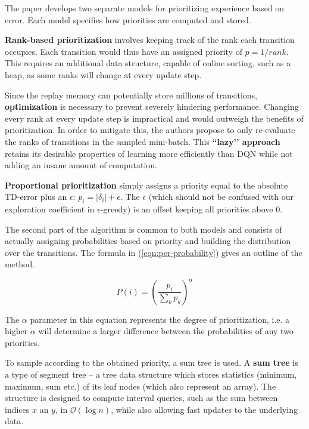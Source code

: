 The paper develops two separate models for prioritizing experience based on error.
Each model specifies how priorities are computed and stored.

\textbf{Rank-based prioritization} involves keeping track of the rank each transition occupies.
Each transition would thus have an assigned priority of $p = 1 / rank$.
This requires an additional data structure, capable of online sorting, such as a heap, as some ranks will change at every update step.

Since the replay memory can potentially store millions of transitions, \textbf{optimization} is necessary to prevent severely hindering performance.
Changing every rank at every update step is impractical and would outweigh the benefits of prioritization.
In order to mitigate this, the authors propose to only re-evaluate the ranks of transitions in the sampled mini-batch.
This \textbf{``lazy’’ approach} retains its desirable properties of learning more efficiently than DQN while not adding an insane amount of computation.

\textbf{Proportional prioritization} simply assigns a priority equal to the absolute TD-error plus an $\epsilon$: $p_{i} = |\delta_{i}| + \epsilon$.
The $\epsilon$ (which should not be confused with our exploration coefficient in $\epsilon$-greedy) is an offset keeping all priorities above $0$.

The second part of the algorithm is common to both models and consists of actually assigning probabilities based on priority and building the distribution over the transitions. The formula in (\ref{eqn:per-probability}) gives an outline of the method.

\begin{equation} \label{eqn:per-probability}
    P(i) =  \left( \frac{p_i}{\sum_{k}{p_{k}}} \right)^\alpha
\end{equation}

The $\alpha$ parameter in this equation represents the degree of prioritization, i.e. a higher $\alpha$ will determine a larger difference between the probabilities of any two priorities.

To sample according to the obtained priority, a sum tree is used.
A \textbf{sum tree} is a type of segment tree -- a tree data structure which stores statistics (minimum, maximum, sum etc.) of its leaf nodes (which also represent an array).
The structure is designed to compute interval queries, such as the sum between indices $x$ an $y$, in $\mathcal{O}(\log{n})$, while also allowing fast updates to the underlying data.


